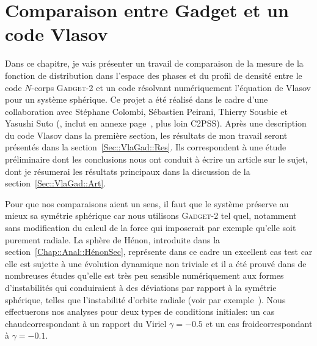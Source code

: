 \chapter{Comparaison entre Gadget et un code Vlasov\label{Chap::VlasovGadget}}
	\minitoc%



	Dans ce chapitre, je vais présenter un travail de comparaison de la mesure de la fonction de distribution dans l'espace des phases et du profil de densité
	entre le code $N$-corps \textsc{Gadget-2} et un code résolvant
	numériquement l'équation de Vlasov pour un système sphérique. Ce projet a été réalisé dans le cadre d'une collaboration avec Stéphane
	Colombi, Sébastien Peirani, Thierry Sousbie et Yasushi Suto (\citet{C2PSS}, inclut en annexe page~\pageref{Part::Article}, plus loin C2PSS). Après une description du code Vlasov dans la première section, 
	les résultats de mon travail seront présentés dans la section~\ref{Sec::VlaGad::Res}. 
	Ils correspondent à une étude préliminaire dont les conclusions nous ont conduit à écrire un article sur le sujet, dont je résumerai les résultats
	principaux dans la discussion de la section~\ref{Sec::VlaGad::Art}.

	Pour que nos comparaisons aient un sens, il faut que le système préserve au mieux sa symétrie sphérique car nous utilisons \textsc{Gadget-2} tel quel,
	notamment sans modification du calcul de la force qui imposerait par exemple qu'elle soit purement radiale. La sphère de Hénon, introduite dans la
	section~\ref{Chap::Anal::HénonSec}, représente dans ce cadre un excellent cas test car elle est sujette à une évolution dynamique non triviale et il a été
	prouvé dans de nombreuses études qu'elle est très peu sensible numériquement aux formes d'instabilités qui conduiraient à des déviations par rapport à la
	symétrie sphérique, telles que l'instabilité d'orbite radiale (voir par exemple~\citet{albada,roy,barneslanzel}). Nous effectuerons nos analyses pour deux
	types de conditions initiales: un cas \og{}chaud\fg correspondant à un rapport du Viriel $\gamma=-0.5$ et un cas \og{}froid\fg correspondant à
	$\gamma=-0.1$.
	
